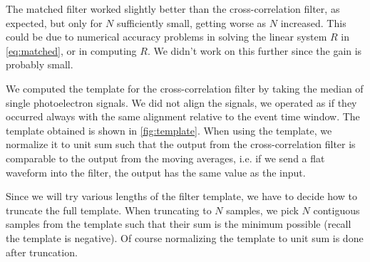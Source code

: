 
\begin{figure}
    

\end{figure}

The matched filter worked slightly better than the cross-correlation filter, as
expected, but only for $N$ sufficiently small, getting worse as $N$ increased.
This could be due to numerical accuracy problems in solving the linear system
$R$ in \autoref{eq:matched}, or in computing $R$. We didn't work on this
further since the gain is probably small.


We computed the template for the cross-correlation filter by taking the median
of single photoelectron signals. We did not align the signals, we operated as
if they occurred always with the same alignment relative to the event time
window. The template obtained is shown in \autoref{fig:template}. When using
the template, we normalize it to unit sum such that the output from the
cross-correlation filter is comparable to the output from the moving averages,
i.e. if we send a flat waveform into the filter, the output has the same value
as the input.



Since we will try various lengths of the filter template, we have to decide how
to truncate the full template. When truncating to $N$ samples, we pick $N$
contiguous samples from the template such that their sum is the minimum
possible (recall the template is negative). Of course normalizing the template
to unit sum is done after truncation.

